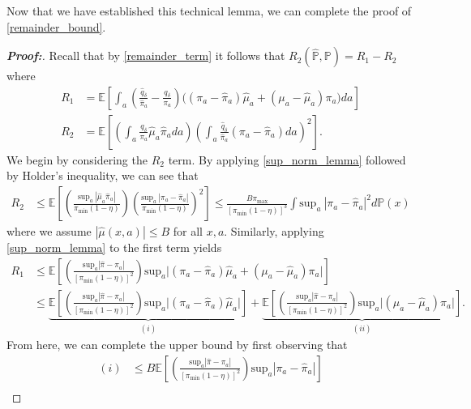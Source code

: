 \documentclass[11pt,twoside]{article}
\theoremstyle{definition}
\theoremstyle{remark}
\begin{document}
Now that we have established this technical lemma, we can complete the proof of \cref{remainder_bound}. 
\begin{proof}[\textbf{Proof:}]
    Recall that by \cref{remainder_term} it follows that  $R_2(\widehat{\mathbb{P}}, \mathbb{P}) = R_1 - R_2$ where
    \begin{align*}
        R_1 &= \mathbb{E} \left[\int_a \left(\frac{\widehat{q}_\delta}{\widehat{\pi}_a} - \frac{q_\delta}{\pi_a} \right)\Big((\pi_a - \widehat{\pi}_a) \widehat{\mu}_a + (\mu_a - \widehat{\mu}_a) \pi_a \Big) da\right]  \\
        R_2 &= \mathbb{E} \left[\left(\int_a \frac{q_\delta}{\pi_a} \widehat{\mu}_a\widehat{\pi}_a da \right)\left(\int_a \frac{\widehat{q}_\delta}{\widehat{\pi}_a} (\pi_a - \widehat{\pi}_a) da \right)^2\right].
    \end{align*}
    We begin by considering the $R_2$ term. By applying \cref{sup_norm_lemma} followed by Holder's inequality, we can see that
    \begin{align*}
        R_2 &\leq \mathbb{E}\left[\left( \frac{\text{sup}_a \ |\widehat{\mu}_a \widehat{\pi}_a |}{\pi_{\min}(1 - \eta)}   \right)\left( \frac{\text{sup}_a \ | \pi_a - \widehat{\pi}_a |}{\pi_{\min}(1 - \eta)} \right)^2\right] \leq \frac{B \pi_{\max}}{[\pi_{\min}(1 - \eta)]^3} \int \text{sup}_a \ | \pi_a - \widehat{\pi}_a |^2 d\mathbb{P}(x)
    \end{align*}
    where we assume $|\widehat{\mu}(x, a)| \leq B$ for all $x, a$. Similarly, applying \cref{sup_norm_lemma} to the first term yields
    \begin{align*}
        R_1 &\leq \mathbb{E}\left[\left(\frac{\text{sup}_a | \widehat{\pi} - \pi_a| }{[\pi_{\min}(1-\eta)]^2} \right)\text{sup}_a   \Big| (\pi_a - \widehat{\pi}_a) \widehat{\mu}_a + (\mu_a - \widehat{\mu}_a) \pi_a \Big|   \right] \\
        &\leq \underbrace{\mathbb{E} \left[\left(\frac{\text{sup}_a | \widehat{\pi} - \pi_a| }{[\pi_{\min}(1-\eta)]^2} \right)\text{sup}_a   \big| (\pi_a - \widehat{\pi}_a) \widehat{\mu}_a \big|  \right]}_{(i)} + \underbrace{\mathbb{E} \left[\left(\frac{\text{sup}_a | \widehat{\pi} - \pi_a| }{[\pi_{\min}(1-\eta)]^2} \right) \text{sup}_a \big| (\mu_a - \widehat{\mu}_a) \pi_a \big|  \right]}_{(ii)}. 
\end{align*}
From here, we can complete the upper bound by first observing that
\begin{align*}
    (i) &\leq B \mathbb{E} \left[\left(\frac{\text{sup}_a | \widehat{\pi} - \pi_a| }{[\pi_{\min}(1-\eta)]^2} \right)\text{sup}_a  | \pi_a - \widehat{\pi}_a  |  \right] \\

\end{align*}
\end{proof}
\end{document}

